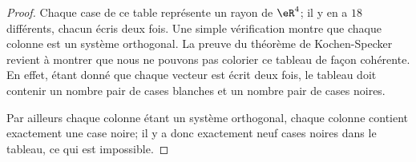\begin{proof}
    Chaque case de ce table représente un rayon de \( \eR^4\); il y en a \( 18\) différents, chacun écris deux fois. Une simple vérification montre que chaque colonne est un système orthogonal. La preuve du théorème de Kochen-Specker revient à montrer que nous ne pouvons pas colorier ce tableau de façon cohérente. En effet, étant donné que chaque vecteur est écrit deux fois, le tableau doit contenir un nombre pair de cases blanches et un nombre pair de cases noires.

    Par ailleurs chaque colonne étant un système orthogonal, chaque colonne contient exactement une case noire; il y a donc exactement neuf cases noires dans le tableau, ce qui est impossible.

\end{proof}
